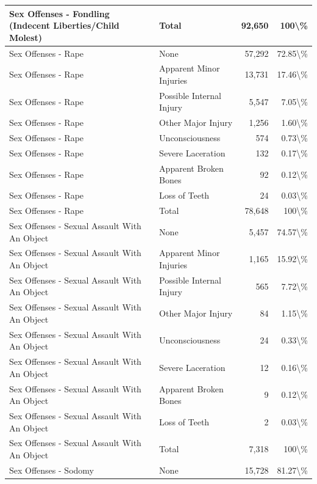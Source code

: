 \documentclass[
]{krantz}
\begin{document}
\begin{longtable}[t]{l|l|r|r}
\hline
Sex Offenses - Fondling (Indecent Liberties/Child Molest) & Total & 92,650 & 100\textbackslash{}\%\\
\hline
Sex Offenses - Rape & None & 57,292 & 72.85\textbackslash{}\%\\
\hline
Sex Offenses - Rape & Apparent Minor Injuries & 13,731 & 17.46\textbackslash{}\%\\
\hline
Sex Offenses - Rape & Possible Internal Injury & 5,547 & 7.05\textbackslash{}\%\\
\hline
Sex Offenses - Rape & Other Major Injury & 1,256 & 1.60\textbackslash{}\%\\
\hline
Sex Offenses - Rape & Unconsciousness & 574 & 0.73\textbackslash{}\%\\
\hline
Sex Offenses - Rape & Severe Laceration & 132 & 0.17\textbackslash{}\%\\
\hline
Sex Offenses - Rape & Apparent Broken Bones & 92 & 0.12\textbackslash{}\%\\
\hline
Sex Offenses - Rape & Loss of Teeth & 24 & 0.03\textbackslash{}\%\\
\hline
Sex Offenses - Rape & Total & 78,648 & 100\textbackslash{}\%\\
\hline
Sex Offenses - Sexual Assault With An Object & None & 5,457 & 74.57\textbackslash{}\%\\
\hline
Sex Offenses - Sexual Assault With An Object & Apparent Minor Injuries & 1,165 & 15.92\textbackslash{}\%\\
\hline
Sex Offenses - Sexual Assault With An Object & Possible Internal Injury & 565 & 7.72\textbackslash{}\%\\
\hline
Sex Offenses - Sexual Assault With An Object & Other Major Injury & 84 & 1.15\textbackslash{}\%\\
\hline
Sex Offenses - Sexual Assault With An Object & Unconsciousness & 24 & 0.33\textbackslash{}\%\\
\hline
Sex Offenses - Sexual Assault With An Object & Severe Laceration & 12 & 0.16\textbackslash{}\%\\
\hline
Sex Offenses - Sexual Assault With An Object & Apparent Broken Bones & 9 & 0.12\textbackslash{}\%\\
\hline
Sex Offenses - Sexual Assault With An Object & Loss of Teeth & 2 & 0.03\textbackslash{}\%\\
\hline
Sex Offenses - Sexual Assault With An Object & Total & 7,318 & 100\textbackslash{}\%\\
\hline
Sex Offenses - Sodomy & None & 15,728 & 81.27\textbackslash{}\%\\

\end{longtable}
\end{document}
